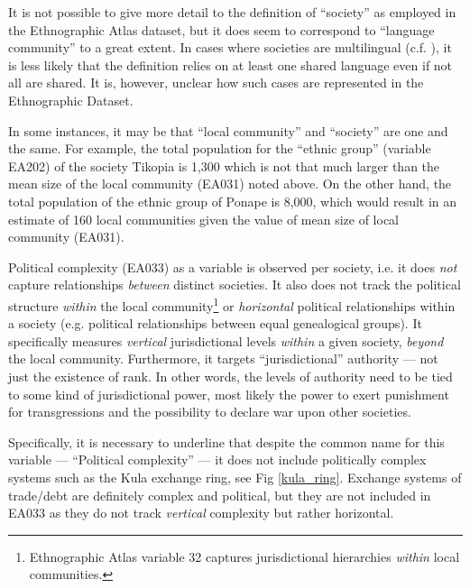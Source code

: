 \documentclass[unnumsec,webpdf,modern,medium]{oup-authoring-template}
\begin{document}
\begin{appendices}
It is not possible to give more detail to the definition of ``society'' as employed in the Ethnographic Atlas dataset, but it does seem to correspond to ``language community'' to a great extent. In cases where societies are multilingual (c.f. \citet{evans2017did}), it is less likely that the definition relies on at least one shared language even if not all are shared. It is, however, unclear how such cases are represented in the Ethnographic Dataset.

In some instances, it may be that ``local community'' and ``society'' are one and the same. For example, the total population for the ``ethnic group'' (variable EA202) of the society Tikopia is 1,300 which is not that much larger than the mean size of the local community (EA031) noted above. On the other hand, the total population of the ethnic group of Ponape is 8,000, which would result in an estimate of 160 local communities given the value of mean size of local community (EA031).
  
Political complexity (EA033) as a variable is observed per society, i.e. it does \emph{not} capture relationships \emph{between} distinct societies. It also does not track the political structure \emph{within} the local community\footnote{Ethnographic Atlas variable 32 captures jurisdictional hierarchies \emph{within} local communities.} or \emph{horizontal} political relationships within a society (e.g. political relationships between equal genealogical groups). It specifically measures \emph{vertical} jurisdictional levels \emph{within} a given society, \emph{beyond} the local community. Furthermore, it targets ``jurisdictional'' authority --- not just the existence of rank. In other words, the levels of authority need to be tied to some kind of jurisdictional power, most likely the power to exert punishment for transgressions and the possibility to declare war upon other societies. 

Specifically, it is necessary to underline that despite the common name for this variable --- ``Political complexity'' --- it does not include politically complex systems such as the Kula exchange ring\citet{damon2002kula}, see Fig \ref{kula_ring}. Exchange systems of trade/debt are definitely complex and political, but they are not included in EA033 as they do not track \emph{vertical} complexity but rather horizontal.


\end{appendices}
\end{document}
